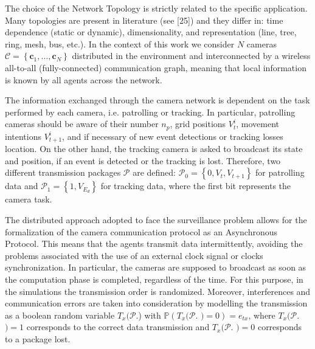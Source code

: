 \documentclass[conference]{IEEEtran}
\begin{document}
The choice of the Network Topology is strictly related to the specific application. Many topologies are present in literature (see [25]) and they differ in: time dependence (static or dynamic), dimensionality, and representation (line, tree, ring, mesh, bus, etc.). In the context of this work we consider $N$ cameras $\mathcal{C}=\left\{\mathbf{c}_{1}, \ldots, \mathbf{c}_{N}\right\}$ distributed in the environment and interconnected by a wireless all-to-all (fully-connected) communication graph, meaning that local information is known by all agents across the network.

The information exchanged through the camera network is dependent on the task performed by each camera, i.e. patrolling or tracking. In particular, patrolling cameras should be aware of their number $n_{p}$, grid positions $V_{t}^{i}$, movement intentions $V_{t+1}^{i}$, and if necessary of new event detections or tracking losses location. On the other hand, the tracking camera is asked to broadcast its state and position, if an event is detected or the tracking is lost. Therefore, two different transmission packages $\mathcal{P}$ are defined: $\mathcal{P}_{0}=\left\{0, V_{t}, V_{t+1}\right\}$ for patrolling data and $\mathcal{P}_{1}=\left\{1, V_{E_{d}}\right\}$ for tracking data, where the first bit represents the camera task.

The distributed approach adopted to face the surveillance problem allows for the formalization of the camera communication protocol as an Asynchronous Protocol. This means that the agents transmit data intermittently, avoiding the problems associated with the use of an external clock signal or clocks synchronization. In particular, the cameras are supposed to broadcast as soon as the computation phase is completed, regardless of the time. For this purpose, in the simulations the transmission order is randomized. Moreover, interferences and communication errors are taken into consideration by modelling the transmission as a boolean random variable $T_{x}(\mathcal{P}$.) with $\mathbb{P}\left(T_{x}(\mathcal{P}\right.$. $\left.)=0\right)=e_{t x}$, where $T_{x}(\mathcal{P}$. $)=1$ corresponds to the correct data transmission and $T_{x}(\mathcal{P}$. $)=0$ corresponds to a package lost.
\end{document}
